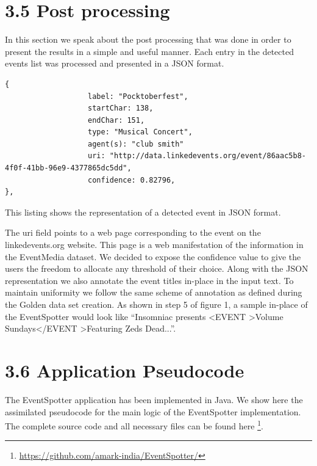 \documentclass[a4paper,11pt]{report}
\begin{document}

\section*{3.5 Post processing}

In this section we speak about the post processing that was done in order to present the results in a simple and useful manner. Each entry in the detected events list was processed and presented in a JSON format. \newline


\begin{lstlisting}
{
                   label: "Pocktoberfest",
                   startChar: 138,
                   endChar: 151,
                   type: "Musical Concert",
                   agent(s): "club smith"
                   uri: "http://data.linkedevents.org/event/86aac5b8-4f0f-41bb-96e9-4377865dc5dd",
                   confidence: 0.82796,
},
\end{lstlisting}
This listing shows the representation of a detected event in JSON format.\newline \newline

The uri field points to a web page corresponding to the event on the linkedevents.org website. This page is a  web manifestation of the information in the EventMedia dataset. We decided to expose the confidence value to give the users the freedom to allocate any threshold of their choice. Along with the JSON representation we also annotate the event titles in-place in the input text. To maintain uniformity we follow the same scheme of annotation as defined during the Golden data set creation. As shown in step 5 of figure 1, a sample in-place of the EventSpotter would look like ``Insomniac presents \textless EVENT \textgreater Volume Sundays\textless /EVENT \textgreater Featuring Zeds Dead...''. 

\section*{3.6 Application Pseudocode}
The EventSpotter application has been implemented in Java. We show here the assimilated pseudocode for the main logic of the EventSpotter implementation. The complete source code and all necessary files can be found here \footnote{\url{https://github.com/amark-india/EventSpotter/}}. \newline
\end{document}
